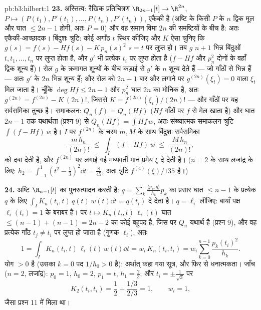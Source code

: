 \begin{solution}{pb:b3:hilbert:1}
\textbf{23.} अस्तित्व: रैखिक प्रतिचित्रण $\R_{2n-1}[t] \to
\R^{2n}$, $P \mapsto (P(t_1), P'(t_1), \dots, P(t_n),
P'(t_n))$, एकैकी है
(अष्टि के किसी $P$ के $n$ द्विक मूल और घात $\leq 2n - 1$ होगी, अतः $P = 0$)
और वह समान विमा $2n$ की समष्टियों के बीच है: अतः एकैकी-आच्छादक।
बिंदुशः त्रुटि: कोई अगाँठ $t$ स्थिर कीजिए और $K$ ऐसा चुनिए कि
$g(s) = f(s) - Hf(s) -
K\,p_n(s)^2$ $s = t$ पर लुप्त हो। तब $g$ $n + 1$ भिन्न बिंदुओं $t, t_1, \dots, t_n$ पर लुप्त
होता है, और $g'$ भी प्रत्येक $t_i$ पर लुप्त होता है ($f - Hf$ और $p_n^2$
दोनों के वहाँ द्विक शून्य हैं)। रोल $g$ के क्रमागत शून्यों के बीच
कड़ाई से $g'$ के $n$ शून्य देते हैं --- जो गाँठों से भिन्न हैं
--- अतः $g'$ के $2n$ भिन्न शून्य हैं; और रोल को $2n - 1$ बार और लगाने
पर $g^{(2n)}(\xi_t) = 0$ वाला $\xi_t$ मिल जाता है। चूँकि $\deg Hf \leq 2n - 1$ और $p_n^2$ घात $2n$ का
मोनिक है, अतः $g^{(2n)} = f^{(2n)} - K\,(2n)!$, जिससे $K =
f^{(2n)}(\xi_t)/(2n)!$ --- और गाँठों पर यह सर्वसमिका तुच्छ
है। समाकलन: $Q_n(f) = Q_n(Hf)$ ($Hf$ गाँठों पर $f$ से मेल खाता है) और घात $2n - 1$
तक यथार्थता (प्रश्न 9) से $Q_n(Hf) = \int Hf\,w$, अतः संख्यात्मक समाकलन त्रुटि $\int(f - Hf)\,w$
है। $I$ पर $f^{(2n)}$ के चरम $m, M$ के साथ बिंदुशः सर्वसमिका
\[
\frac{m\,h_n}{(2n)!} \;\leq\; \int_I(f - Hf)\,w
\;\leq\; \frac{M\,h_n}{(2n)!} ,
\]
को दबा देती है, और  $f^{(2n)}$ पर लगाई गई मध्यवर्ती मान प्रमेय $\xi$
दे देती है। ($n = 2$ के साथ लजांद्र के लिए: $h_2
= \int_{-1}^1(t^2 - \frac13)^2\dd t = \frac8{45}$, अतः त्रुटि $f^{(4)}(\xi)/135$
है।)

\textbf{24.} अष्टि $\R_{n-1}[t]$ का पुनरुत्पादन करती है: $q = \sum_k\frac{\langle p_k, q\rangle}{h_k}p_k$ का प्रसार
घात $\leq n - 1$ के प्रत्येक $q$ के लिए $\int_I K_n(t_i, t)\,q(t)\,w(t)\dd t = q(t_i)$ दे देता है। $q = \ell_i$ लीजिए:
बायाँ पक्ष $\ell_i(t_i) = 1$ के बराबर है। पर $t \mapsto K_n(t_i,
t)\,\ell_i(t)$ घात $\leq (n - 1) + (n
- 1) = 2n - 2$ का कोई बहुपद है,
जिस पर $Q_n$ यथार्थ है (प्रश्न 9), और वह प्रत्येक गाँठ $t_j \neq t_i$ पर लुप्त
हो जाता है (गुणक $\ell_i$), अतः
\[
1 = \int_I K_n(t_i, t)\,\ell_i(t)\,w(t)\dd t
= w_i\,K_n(t_i, t_i)
= w_i\sum_{k=0}^{n-1}\frac{p_k(t_i)^2}{h_k} .
\]
योग $> 0$ है (उसका $k = 0$ पद $1/h_0 > 0$ है): अर्थात् कहा गया सूत्र, और
फिर से धनात्मकता। जाँच ($n = 2$, लजांद्र): $p_0 = 1$, $h_0 = 2$, $p_1 = t$, $h_1 = \frac23$;
और $t_i = \pm\frac1{\sqrt3}$ पर
\[
K_2(t_i, t_i) = \frac12 + \frac{1/3}{2/3} = 1,
\qquad w_i = 1,
\]
जैसा प्रश्न 11 में मिला था।


\end{solution}
